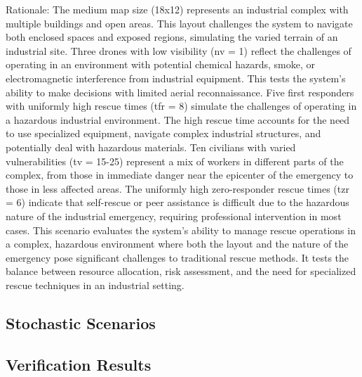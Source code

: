 Rationale:
The medium map size (18x12) represents an industrial complex with multiple buildings and open areas. This layout challenges the system to navigate both enclosed spaces and exposed regions, simulating the varied terrain of an industrial site.
Three drones with low visibility (nv = 1) reflect the challenges of operating in an environment with potential chemical hazards, smoke, or electromagnetic interference from industrial equipment. This tests the system's ability to make decisions with limited aerial reconnaissance.
Five first responders with uniformly high rescue times (tfr = 8) simulate the challenges of operating in a hazardous industrial environment. The high rescue time accounts for the need to use specialized equipment, navigate complex industrial structures, and potentially deal with hazardous materials.
Ten civilians with varied vulnerabilities (tv = 15-25) represent a mix of workers in different parts of the complex, from those in immediate danger near the epicenter of the emergency to those in less affected areas. The uniformly high zero-responder rescue times (tzr = 6) indicate that self-rescue or peer assistance is difficult due to the hazardous nature of the industrial emergency, requiring professional intervention in most cases.
This scenario evaluates the system's ability to manage rescue operations in a complex, hazardous environment where both the layout and the nature of the emergency pose significant challenges to traditional rescue methods. It tests the balance between resource allocation, risk assessment, and the need for specialized rescue techniques in an industrial setting.

\subsection{Stochastic Scenarios}

\subsection{Verification Results}